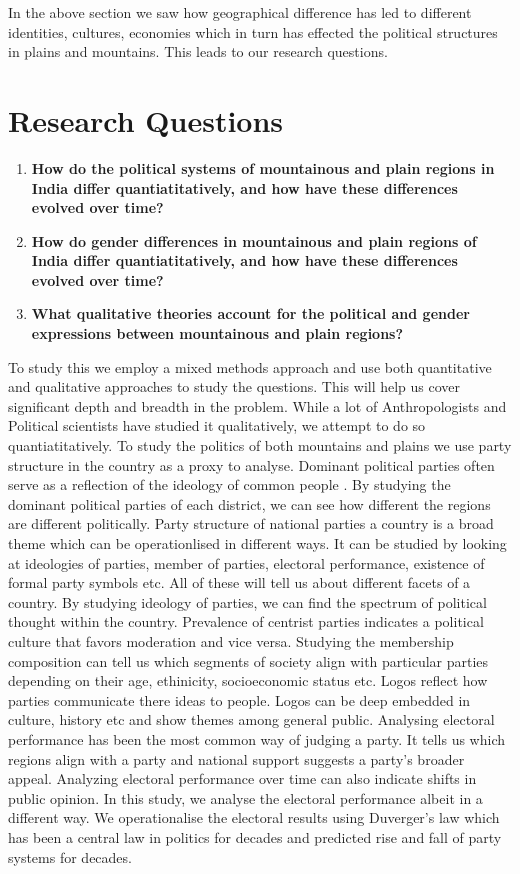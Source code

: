 \vspace{0.3cm}

In the above section we saw how geographical difference has led to different identities, cultures, economies which in turn has effected the political structures in plains and mountains. This leads to our research questions.

\section{Research Questions}

\begin{enumerate}
    \item \textbf{How do the political systems of mountainous and plain regions in India differ quantiatitatively, and how have these differences evolved over time? }
    \item \textbf{How do gender differences in mountainous and plain regions of India differ quantiatitatively, and how have these differences evolved over time?}
    \item \textbf{What qualitative theories account for the political and gender expressions between mountainous and plain regions?}
\end{enumerate}

To study this we employ a mixed methods approach and use both quantitative and qualitative approaches to study the questions. This will help us cover significant depth and breadth in the problem. While a lot of Anthropologists and Political scientists have studied it qualitatively, we attempt to do so quantiatitatively. To study the politics of both mountains and plains we use party structure in the country as a proxy to analyse. Dominant political parties often serve as a reflection of the ideology of common people \citep{romeijn2020political}. By studying the dominant political parties of each district, we can see how different the regions are different politically. Party structure of national parties a country is a broad theme which can be operationlised in different ways. It can be studied by looking at ideologies of parties, member of parties, electoral performance, existence of formal party symbols etc. All of these will tell us about different facets of a country. By studying ideology of parties, we can find the spectrum of political thought within the country. Prevalence of centrist parties indicates a political culture that favors moderation and vice versa. Studying the membership composition can tell us  which segments of society align with particular parties depending on their age, ethinicity, socioeconomic status etc. Logos reflect how parties communicate there ideas to people. Logos can be deep embedded in culture, history etc and show themes among general public. Analysing electoral performance has been the most common way of judging a party. It tells us which regions align with a party and national support suggests a party's broader appeal. Analyzing electoral performance over time can also indicate shifts in public opinion. In this study, we analyse the electoral performance albeit in a different way. We operationalise the electoral results using Duverger's law which has been a central law in politics for decades and predicted rise and fall of party systems for decades. 

